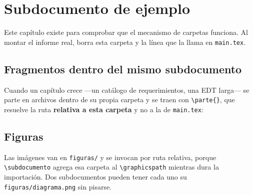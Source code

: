 
\chapter{Subdocumento de ejemplo}
\label{cap:ejemplo}

Este capítulo existe para comprobar que el mecanismo de carpetas funciona.
Al montar el informe real, borra esta carpeta y la línea que la llama en
\texttt{main.tex}.


\section{Fragmentos dentro del mismo subdocumento}

Cuando un capítulo crece —un catálogo de requerimientos, una EDT larga— se
parte en archivos dentro de su propia carpeta y se traen con
\texttt{\textbackslash parte\{\}}, que resuelve la ruta \textbf{relativa a esta
carpeta} y no a la de \texttt{main.tex}:


\section{Figuras}

Las imágenes van en \texttt{figuras/} y se invocan por ruta relativa, porque
\texttt{\textbackslash subdocumento} agrega esa carpeta al
\texttt{\textbackslash graphicspath} mientras dura la importación. Dos
subdocumentos pueden tener cada uno su \texttt{figuras/diagrama.png} sin
pisarse.
